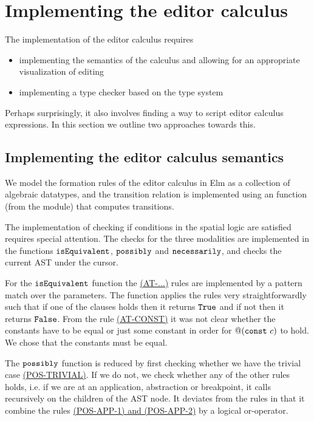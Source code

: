 \section{Implementing the editor calculus}
\label{sec:implementing}

The implementation of the editor calculus requires
%
\begin{itemize}
  \item implementing the semantics of the calculus and allowing for an
        appropriate visualization of editing
  \item implementing a type checker based on the type system
\end{itemize}
%
Perhaps surprisingly, it also involves finding a way to script editor
calculus expressions. In this section we outline two approaches towards this.

\subsection{Implementing the editor calculus semantics}

We model the formation rules of the editor calculus in Elm as a
collection of algebraic datatypes, and the transition relation is
implemented using an  function (from the 
module) that computes transitions.

The implementation of checking if conditions in the spatial logic are
satisfied requires special attention. The checks for the three
modalities are implemented in the functions $\texttt{isEquivalent}$,
$\texttt{possibly}$ and $\texttt{necessarily}$, and checks the current AST
under the cursor.

For the $\texttt{isEquivalent}$ function the
\hyperref[fig:conditionreductionrules]{(AT-...)} rules are implemented by a
pattern match over the parameters. The function applies the rules very
straightforwardly such that if one of the clauses holds then it returns
$\texttt{True}$ and if not then it returns $\texttt{False}$. From the rule
\hyperref[fig:conditionreductionrules]{(AT-CONST)} it was not clear whether the
constants have to be equal or just some constant in order for $@(\texttt{const}~c)$
to hold. We chose that the constants must be equal.

The $\texttt{possibly}$ function is reduced by first checking whether we have the
trivial case \hyperref[fig:conditionreductionrules]{(POS-TRIVIAL)}. If we do
not, we check whether any of the other rules holds, i.e. if we are at an
application, abstraction or breakpoint, it calls recursively on the children of
the AST node. It deviates from the rules in that it combine the rules
\hyperref[fig:conditionreductionrules]{(POS-APP-1) and (POS-APP-2)} by a logical
or-operator.

